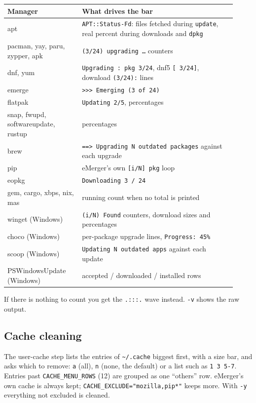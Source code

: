 \documentclass[11pt,a4paper]{article}
\begin{document}
\begin{longtable}{@{}p{0.30\linewidth} p{0.62\linewidth}@{}}
\toprule
\textbf{Manager} & \textbf{What drives the bar} \\
\midrule \endhead
apt & \texttt{APT::Status-Fd}: files fetched during \texttt{update}, real
      percent during downloads and \texttt{dpkg} \\
pacman, yay, paru, zypper, apk & \texttt{(3/24) upgrading \dots} counters \\
dnf, yum & \texttt{Upgrading : pkg 3/24}, dnf5 \texttt{[ 3/24]}, download
      \texttt{(3/24):} lines \\
emerge & \texttt{>>> Emerging (3 of 24)} \\
flatpak & \texttt{Updating 2/5}, percentages \\
snap, fwupd, softwareupdate, rustup & percentages \\
brew & \texttt{==> Upgrading N outdated packages} against each upgrade \\
pip & eMerger's own \texttt{[i/N] pkg} loop \\
eopkg & \texttt{Downloading 3 / 24} \\
gem, cargo, xbps, nix, mas & running count when no total is printed \\
winget (Windows) & \texttt{(i/N) Found} counters, download sizes and percentages \\
choco (Windows) & per-package upgrade lines, \texttt{Progress: 45\%} \\
scoop (Windows) & \texttt{Updating N outdated apps} against each update \\
PSWindowsUpdate (Windows) & accepted / downloaded / installed rows \\
\bottomrule
\end{longtable}

If there is nothing to count you get the \texttt{.:::.} wave instead.
\texttt{-v} shows the raw output.

\subsection{Cache cleaning}
The user-cache step lists the entries of \verb|~/.cache| biggest first,
with a size bar, and asks which to remove: \texttt{a} (all), \texttt{n}
(none, the default) or a list such as \texttt{1 3 5-7}. Entries past
\verb|CACHE_MENU_ROWS| (12) are grouped as one ``others'' row. eMerger's
own cache is always kept; \verb|CACHE_EXCLUDE="mozilla,pip*"| keeps more.
With \texttt{-y} everything not excluded is cleaned.
\end{document}
